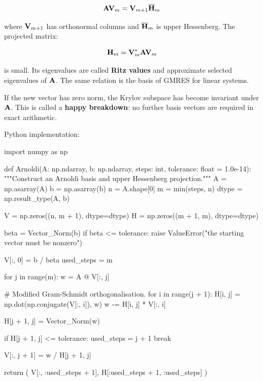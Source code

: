 \begin{equation}
    \mathbf{A}\mathbf{V}_m=\mathbf{V}_{m+1}\overline{\mathbf{H}}_m
\end{equation}

where $ \mathbf{V}_{m+1} $ has orthonormal columns and
$ \overline{\mathbf{H}}_m $ is upper Hessenberg. The projected matrix:

\begin{equation}
    \mathbf{H}_m=\mathbf{V}_m^{*}\mathbf{A}\mathbf{V}_m
\end{equation}

is small. Its eigenvalues are called \textbf{Ritz values} and approximate
selected eigenvalues of $ \mathbf{A} $. The same relation is the basis of GMRES for
linear systems.

If the new vector has zero norm, the Krylov subspace has become invariant under
$ \mathbf{A} $. This is called a \textbf{happy breakdown}: no further basis vectors
are required in exact arithmetic.

Python implementation:

\begin{python}
import numpy as np


def Arnoldi(A: np.ndarray,
            b: np.ndarray,
            steps: int,
            tolerance: float = 1.0e-14):
    """Construct an Arnoldi basis and upper Hessenberg projection."""
    A = np.asarray(A)
    b = np.asarray(b)
    n = A.shape[0]
    m = min(steps, n)
    dtype = np.result_type(A, b)

    V = np.zeros((n, m + 1), dtype=dtype)
    H = np.zeros((m + 1, m), dtype=dtype)

    beta = Vector_Norm(b)
    if beta <= tolerance:
        raise ValueError("the starting vector must be nonzero")

    V[:, 0] = b / beta
    used_steps = m

    for j in range(m):
        w = A @ V[:, j]

        # Modified Gram-Schmidt orthogonalisation.
        for i in range(j + 1):
            H[i, j] = np.dot(np.conjugate(V[:, i]), w)
            w -= H[i, j] * V[:, i]

        H[j + 1, j] = Vector_Norm(w)

        if H[j + 1, j] <= tolerance:
            used_steps = j + 1
            break

        V[:, j + 1] = w / H[j + 1, j]

    return (
        V[:, :used_steps + 1],
        H[:used_steps + 1, :used_steps]
    )
\end{python}

